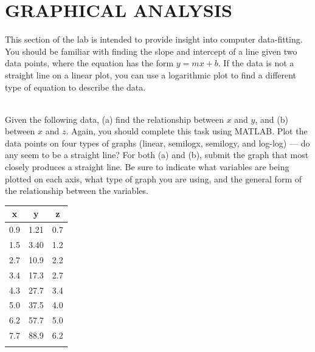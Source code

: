 \documentclass[11pt,letterpaper]{article}
\newcounter{question}[section]
\begin{document}
\section{GRAPHICAL ANALYSIS}
This section of the lab is intended to provide insight into computer data-fitting.  You should be familiar with finding the slope and intercept of a line given two data points, where the equation has the form $y=mx+b$.  If the data is not a straight line on a linear plot, you can use a logarithmic plot to find a different type of equation to describe the data.

\\ 
Given the following data, (a) find the relationship between $x$ and $y$, and (b) between $x$ and $z$.  Again, you should complete this task using MATLAB.  Plot the data points on four types of graphs (linear, semilogx, semilogy, and log-log) --- do any seem to be a straight line? For both (a) and (b), submit the graph that most closely produces a straight line. Be sure to indicate what variables are being plotted on each axis, what type of graph you are using, and the general form of the relationship between the variables. 

\begin{tabular}{ccc}
x & y & z\\
\hline
0.9 & 1.21 & 0.7\\
1.5 & 3.40 & 1.2\\
2.7 & 10.9 & 2.2\\
3.4 & 17.3 & 2.7\\
4.3 & 27.7 & 3.4\\
5.0 & 37.5 & 4.0\\
6.2 & 57.7 & 5.0\\
7.7 & 88.9 & 6.2\\
\hline\\
\end{tabular}
\vspace{.5cm}
\end{document}
